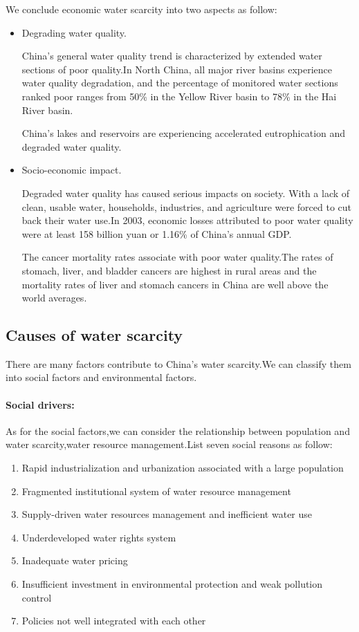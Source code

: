 We conclude economic water scarcity into two aspects as follow:
\begin{itemize}
\item Degrading water quality.

China’s general water quality trend is characterized by extended water sections of poor quality.In North China, all major river basins experience water quality degradation, and the percentage of monitored water sections ranked poor ranges from 50\% in the Yellow River basin to 78\% in the Hai River basin.\cite{SEPA}

China’s lakes and reservoirs are experiencing accelerated eutrophication and degraded water quality.

\item Socio-economic impact.

Degraded water quality has caused serious impacts on society. With a lack of clean, usable water, households, industries, and agriculture were forced to cut back their water use.In 2003, economic losses attributed to poor water quality were at least 158 billion yuan or 1.16\% of China’s annual GDP.\cite{WB2007a}

The cancer mortality rates associate with poor water quality.The rates of stomach, liver, and bladder cancers are highest in rural areas and the mortality rates of liver and stomach cancers in China are well above the world averages.\cite{WB2007a}
\end{itemize}

\subsection{Causes of water scarcity}
There are many factors contribute to China's water scarcity.We can classify them into social factors and environmental factors.

\paragraph{Social drivers:}As for the social factors,we can consider the relationship between population and water scarcity,water resource management.\cite{Review}List seven social reasons as follow:

\begin{enumerate}
\item Rapid industrialization and urbanization associated with a large population
\item Fragmented institutional system of water resource management
\item Supply-driven water resources management and inefficient water use
\item Underdeveloped water rights system
\item Inadequate water pricing
\item Insufficient investment in environmental protection and weak pollution control
\item Policies not well integrated with each other
\end{enumerate}

